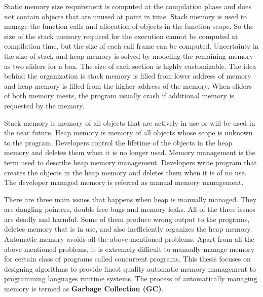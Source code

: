 Static memory size requirement is computed at the compilation phase and does not contain objects that are unused at point in time. Stack memory is used to manage the function calls and allocation of objects in the function scope. So the size of the stack memory required for the execution cannot be computed at compilation time, but the size of each call frame can be computed. Uncertainty in the size of stack and heap memory is solved by modeling the remaining memory as two sliders for a box. The size of each section is highly customizable. The idea behind the organization is stack memory is filled from lower address of memory and heap memory is filled from the higher address of the memory. When sliders of both memory meets, the program usually crash if additional memory is requested by the memory. 

Stack memory is memory of all objects that are actively in use or will be used in the near future. Heap memory is memory of all objects whose scope is unknown to the program. Developers control the lifetime of the objects in the heap memory and deletes them when it is no longer used. Memory management is the term used to describe heap memory management. Developers write program that creates the objects in the heap memory and deletes them when it is of no use. The developer managed memory is referred as manual memory management. 

 There are three main issues that happens when heap is manually managed. They are dangling pointers, double free bugs and memory leaks. All of the three issues are deadly and harmful. Some of them produce wrong output to the programs, deletes memory that is in use, and also inefficiently organizes the heap memory. Automatic memory avoids all the above mentioned problems. Apart from all the above mentioned problems, it is extremely difficult to manually manage memory for certain class of programs called concurrent programs. This thesis focuses on designing algorithms to provide finest quality automatic memory management to programming languages runtime systems. The process of automatically managing memory is termed as \textbf{Garbage Collection (GC)}.

\begin{comment}
Heap memory helps developer to extend the life of dynamically allocated objects. Some object allocated in the heap might get very long life as long as the life of the program running. So these objects have infinite life if programmer did not delete them after their last use. The unwanted objects in the heap occupies the heap memory and might make application run out of memory and exit. In order to avoid psuedo full heap memory errors, programmers determine the life of the dynamically allocated objects and delete them. The dynamically allocated objects can be accessed only by pointers in the static and stack memory. These pointers are also called as \textbf{roots}.

\end{comment}
